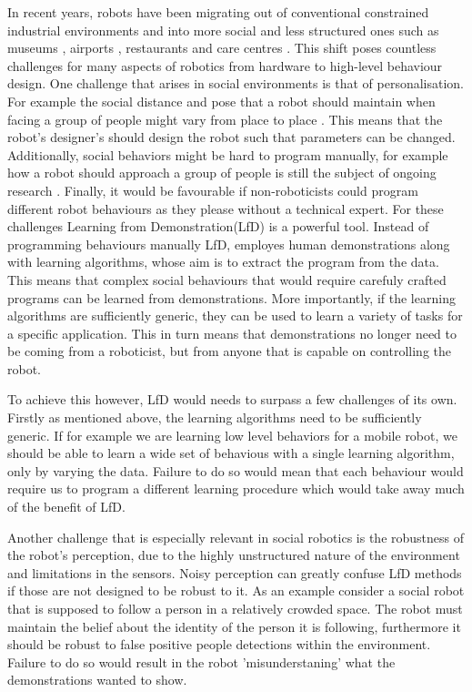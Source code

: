 \documentclass[letterpaper, 10 pt, conference]{ieeeconf}
\begin{document}
In recent years, robots have been migrating out of conventional constrained industrial environments and into more social and less structured ones such as museums \cite{thrun1999minerva}, airports \cite{triebel2015spencer}, restaurants \cite{qing2010research} and care centres \cite{shiarlis2015teresa}. This shift poses countless challenges for many aspects of robotics from hardware  to high-level behaviour design.  One challenge that arises in social environments is that of personalisation. For example the social distance and pose that a robot should maintain when facing a group of people might vary from place to place \cite{joosse2014cultural}. This means that the robot's designer's should design the robot such that parameters can be changed. Additionally, social behaviors might be hard to program manually, for example how a robot should approach a group of people is still the subject of ongoing research \cite{vroon2015dynamics}. Finally, it would be favourable if non-roboticists could program different robot behaviours as they please without a technical expert. For these challenges Learning from Demonstration(LfD) is a powerful tool. Instead of programming behaviours manually LfD, employes human demonstrations along with learning algorithms, whose aim is to extract the program from the data. This means that complex social behaviours that would require carefuly crafted programs can be learned from demonstrations. More importantly, if the learning algorithms are sufficiently generic, they can be used to learn a variety of tasks for a specific application. This in turn means that demonstrations no longer need to be coming from a roboticist, but from anyone that is capable on controlling the robot. 

To achieve this however, LfD would needs to surpass a few challenges of its own. Firstly as mentioned above, the learning algorithms need to be sufficiently generic. If for example we are learning low level behaviors for a mobile robot, we should be able to learn a wide set of behavious with a single learning algorithm, only by varying the data. Failure to do so would mean that each behaviour would require us to program a different learning procedure which would take away much of the benefit of LfD. 

Another challenge that is especially relevant in social robotics is the robustness of the robot's perception, due to the highly unstructured nature of the environment and limitations in the sensors. Noisy perception can greatly confuse LfD methods if those are not designed to be robust to it. As an example consider a social robot that is supposed to follow a person in a relatively crowded space. The robot must maintain the belief about the identity of the person it is following, furthermore it should be robust to false positive people detections within the environment. Failure to do so would result in the robot 'misunderstaning' what the demonstrations wanted to show.
\end{document}
